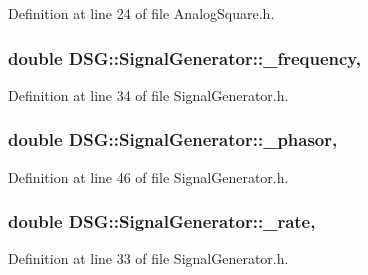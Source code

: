 Definition at line 24 of file Analog\+Square.\+h.

\hypertarget{classDSG_1_1SignalGenerator_a67e296e3506dcdf09402c667cddff9ac}{
\subsubsection[{\+\_\+frequency}]{\setlength{\rightskip}{0pt plus 5cm}double D\+S\+G\+::\+Signal\+Generator\+::\+\_\+frequency\hspace{0.3cm}{\ttfamily [protected]}, {\ttfamily [inherited]}}}\label{classDSG_1_1SignalGenerator_a67e296e3506dcdf09402c667cddff9ac}


Definition at line 34 of file Signal\+Generator.\+h.

\hypertarget{classDSG_1_1SignalGenerator_ac2271b582bf699275f077ecb642a8cd9}{
\subsubsection[{\+\_\+phasor}]{\setlength{\rightskip}{0pt plus 5cm}double D\+S\+G\+::\+Signal\+Generator\+::\+\_\+phasor\hspace{0.3cm}{\ttfamily [protected]}, {\ttfamily [inherited]}}}\label{classDSG_1_1SignalGenerator_ac2271b582bf699275f077ecb642a8cd9}


Definition at line 46 of file Signal\+Generator.\+h.

\hypertarget{classDSG_1_1SignalGenerator_aa10f6c85d9adee901139ea7fb346f39d}{
\subsubsection[{\+\_\+rate}]{\setlength{\rightskip}{0pt plus 5cm}double D\+S\+G\+::\+Signal\+Generator\+::\+\_\+rate\hspace{0.3cm}{\ttfamily [protected]}, {\ttfamily [inherited]}}}\label{classDSG_1_1SignalGenerator_aa10f6c85d9adee901139ea7fb346f39d}


Definition at line 33 of file Signal\+Generator.\+h.

